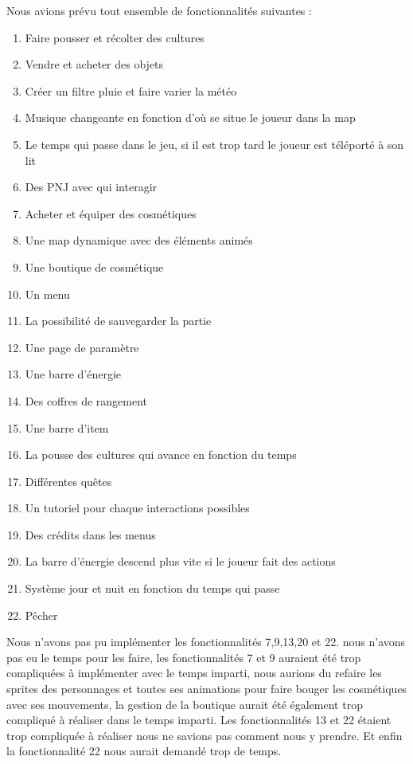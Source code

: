 \documentclass{article}
\begin{document}
Nous avions prévu tout ensemble de fonctionnalités suivantes : 
\begin{enumerate}
         \item Faire pousser et récolter des cultures
         \item Vendre et acheter des objets
         \item Créer un filtre pluie et faire varier la météo
         \item Musique changeante en fonction d'où se situe le joueur dans la map
         \item Le temps qui passe dans le jeu, si il est trop tard le joueur est téléporté à son lit
         \item Des PNJ avec qui interagir
         \item Acheter et équiper des cosmétiques
         \item Une map dynamique avec des éléments animés
         \item Une boutique de cosmétique
         \item Un menu
         \item La possibilité de sauvegarder la partie
         \item Une page de paramètre
         \item Une barre d'énergie
         \item Des coffres de rangement
         \item Une barre d'item
         \item La pousse des cultures qui avance en fonction du temps
         \item Différentes quêtes
         \item Un tutoriel pour chaque interactions possibles
         \item Des crédits dans les menus
         \item La barre d'énergie descend plus vite si le joueur fait des actions
         \item Système jour et nuit en fonction du temps qui passe
         \item Pêcher
\end{enumerate}
Nous n'avons pas pu implémenter les fonctionnalités 7,9,13,20 et 22. nous n'avons pas eu le temps pour les faire, les fonctionnalités 7 et 9 auraient été trop compliquées à implémenter avec le temps imparti, nous aurions du refaire les sprites des personnages et toutes ses animations pour faire bouger les cosmétiques avec ses mouvements, la gestion de la boutique aurait été également trop compliqué à réaliser dans le temps imparti. Les fonctionnalités 13 et 22 étaient trop compliquée à réaliser nous ne savions pas comment nous y prendre. Et enfin la fonctionnalité 22 nous aurait demandé trop de temps.
\end{document}
